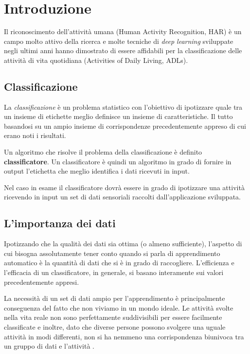 \chapter{Introduzione}

Il riconoscimento dell'attività umana (Human Activity Recognition, HAR) è un campo molto attivo della ricerca e molte 
tecniche di \textit{deep learning} sviluppate negli ultimi anni hanno dimostrato di essere affidabili per la 
classificazione delle attività di vita quotidiana (Activities of Daily Living, ADLs).

\section{Classificazione}
La \textit{classificazione} è un problema statistico con l'obiettivo di ipotizzare quale tra un insieme di etichette
meglio definisce un insieme di caratteristiche. Il tutto basandosi su un ampio insieme di corrispondenze precedentemente appreso
di cui erano noti i risultati.

Un algoritmo che risolve il problema della classificazione è definito \textbf{classificatore}.
Un classificatore è quindi un algoritmo in grado di fornire in output l'etichetta 
che meglio identifica i dati ricevuti in input.

Nel caso in esame il classificatore dovrà essere in grado di ipotizzare una attività ricevendo in input un set di dati sensoriali
raccolti dall'applicazione sviluppata.



\section{L'importanza dei dati}
Ipotizzando che la qualità dei dati sia ottima (o almeno sufficiente), l'aspetto di cui bisogna assolutamente tener conto quando 
si parla di apprendimento automatico è la quantità di dati che si è in grado di raccogliere. 
L'efficienza e l'efficacia di un classificatore, in generale, si basano interamente sui valori precedentemente appresi.

La necessità di un set di dati ampio per l'apprendimento è principalmente conseguenza del fatto che non viviamo in un mondo ideale.
Le attività svolte nella vita reale non sono perfettamente suddivisibili per essere facilmente classificate e inoltre, dato che diverse persone
possono svolgere una uguale attività in modi differenti, non si ha nemmeno una corrispondenza biunivoca tra un gruppo di dati e l'attività \cite{framework_long_term_data_har}.

